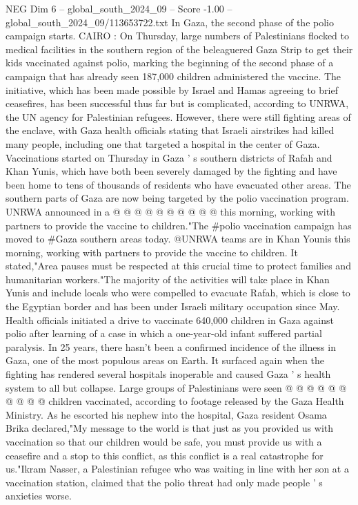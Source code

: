 \begin{textsample}{NEG Dim 6 – global\_south\_2024\_09 – Score -1.00 – global\_south\_2024\_09/113653722.txt}  \label{ex:f6_neg_010}
In Gaza, the second phase of the polio campaign starts.
CAIRO : On Thursday, large numbers of Palestinians flocked to medical facilities in the southern region of the beleaguered Gaza Strip to get their kids vaccinated against polio, marking the beginning of the second phase of a campaign that has already seen 187,000 children administered the vaccine.
The initiative, which has been made possible by Israel and Hamas agreeing to brief ceasefires, has been successful thus far but is complicated, according to UNRWA, the UN agency for Palestinian refugees.
However, there were still fighting areas of the enclave, with Gaza health officials stating that Israeli airstrikes had killed many people, including one that targeted a hospital in the center of Gaza.
Vaccinations started on Thursday in Gaza ' s southern districts of Rafah and Khan Yunis, which have both been severely damaged by the fighting and have been home to tens of thousands of residents who have evacuated other areas.
The southern parts of Gaza are now being targeted by the polio vaccination program.
UNRWA announced in a @ @ @ @ @ @ @ @ @ @ this morning, working with partners to provide the vaccine to children."The \#polio vaccination campaign has moved to \#Gaza southern areas today. @UNRWA teams are in Khan Younis this morning, working with partners to provide the vaccine to children.
It stated,"Area pauses must be respected at this crucial time to protect families and humanitarian workers."The majority of the activities will take place in Khan Yunis and include locals who were compelled to evacuate Rafah, which is close to the Egyptian border and has been under Israeli military occupation since May.
Health officials initiated a drive to vaccinate 640,000 children in Gaza against polio after learning of a case in which a one-year-old infant suffered partial paralysis.
In 25 years, there hasn't been a confirmed incidence of the illness in Gaza, one of the most populous areas on Earth.
It surfaced again when the fighting has rendered several hospitals inoperable and caused Gaza ' s health system to all but collapse.
Large groups of Palestinians were seen @ @ @ @ @ @ @ @ @ @ children vaccinated, according to footage released by the Gaza Health Ministry.
As he escorted his nephew into the hospital, Gaza resident Osama Brika declared,"My message to the world is that just as you provided us with vaccination so that our children would be safe, you must provide us with a ceasefire and a stop to this conflict, as this conflict is a real catastrophe for us."Ikram Nasser, a Palestinian refugee who was waiting in line with her son at a vaccination station, claimed that the polio threat had only made people ' s anxieties worse.

\end{textsample}
